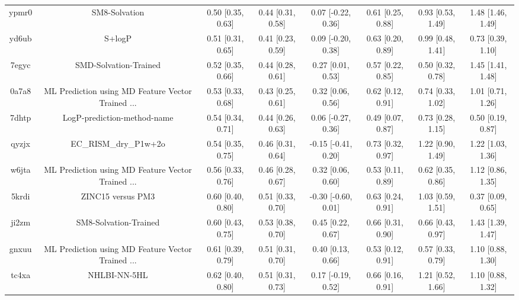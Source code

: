 \documentclass{article}
\begin{document}
\begin{center}
\begin{longtable}{|cccccccc|}
 ypmr0 &                                      SM8-Solvation &  0.50 [0.35, 0.63] &  0.44 [0.31, 0.58] &    0.07 [-0.22, 0.36] &  0.61 [0.25, 0.88] &    0.93 [0.53, 1.49] &     1.48 [1.46, 1.49] \\
 yd6ub &                                             S+logP &  0.51 [0.31, 0.65] &  0.41 [0.23, 0.59] &    0.09 [-0.20, 0.38] &  0.63 [0.20, 0.89] &    0.99 [0.48, 1.41] &     0.73 [0.39, 1.10] \\
 7egyc &                              SMD-Solvation-Trained &  0.52 [0.35, 0.66] &  0.44 [0.28, 0.61] &     0.27 [0.01, 0.53] &  0.57 [0.22, 0.85] &    0.50 [0.32, 0.78] &     1.45 [1.41, 1.48] \\
 0a7a8 &  ML Prediction using MD Feature Vector Trained ... &  0.53 [0.33, 0.68] &  0.43 [0.25, 0.61] &     0.32 [0.06, 0.56] &  0.62 [0.12, 0.91] &    0.74 [0.33, 1.02] &     1.01 [0.71, 1.26] \\
 7dhtp &                        LogP-prediction-method-name &  0.54 [0.34, 0.71] &  0.44 [0.26, 0.63] &    0.06 [-0.27, 0.36] &  0.49 [0.07, 0.87] &    0.73 [0.28, 1.15] &     0.50 [0.19, 0.87] \\
 qyzjx &                              EC\_RISM\_dry\_P1w+2o &  0.54 [0.35, 0.75] &  0.46 [0.31, 0.64] &   -0.15 [-0.41, 0.20] &  0.73 [0.32, 0.97] &    1.22 [0.90, 1.49] &     1.22 [1.03, 1.36] \\
 w6jta &  ML Prediction using MD Feature Vector Trained ... &  0.56 [0.33, 0.76] &  0.46 [0.28, 0.67] &     0.32 [0.06, 0.60] &  0.53 [0.11, 0.89] &    0.62 [0.35, 0.86] &     1.12 [0.86, 1.35] \\
 5krdi &                                  ZINC15 versus PM3 &  0.60 [0.40, 0.80] &  0.51 [0.33, 0.70] &   -0.30 [-0.60, 0.01] &  0.63 [0.24, 0.91] &    1.03 [0.59, 1.51] &     0.37 [0.09, 0.65] \\
 ji2zm &                              SM8-Solvation-Trained &  0.60 [0.43, 0.75] &  0.53 [0.38, 0.70] &     0.45 [0.22, 0.67] &  0.66 [0.31, 0.90] &    0.66 [0.43, 0.97] &     1.43 [1.39, 1.47] \\
 gnxuu &  ML Prediction using MD Feature Vector Trained ... &  0.61 [0.39, 0.79] &  0.51 [0.31, 0.70] &     0.40 [0.13, 0.66] &  0.53 [0.12, 0.91] &    0.57 [0.33, 0.79] &     1.10 [0.88, 1.30] \\
 tc4xa &                                       NHLBI-NN-5HL &  0.62 [0.40, 0.80] &  0.51 [0.31, 0.73] &    0.17 [-0.19, 0.52] &  0.66 [0.16, 0.91] &    1.21 [0.52, 1.66] &     1.10 [0.88, 1.32] \\

\end{longtable}
\end{center}
\end{document}
